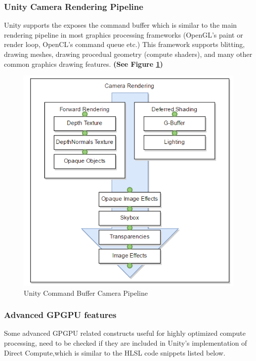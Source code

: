 \documentclass[a4paper,10pt]{article}
\begin{document}
\pagebreak


\subsubsection{Unity Camera Rendering Pipeline}
Unity supports the exposes the command buffer which is similar to the main rendering pipeline in most graphics processing frameworks (OpenGL's paint or render loop, OpenCL's command queue etc.) This framework supports blitting, drawing meshes, drawing procedual geometry (compute shaders), and many other common graphics drawing features. \textbf{(See Figure \ref{fig:gpuPipe})}

\begin{figure}[H]
	\includegraphics[width=\linewidth,height=\paperheight,keepaspectratio]{cameraRender.png}
	\caption{Unity Command Buffer Camera Pipeline}
	\label{fig:gpuPipe}
	\end{figure}

\pagebreak

\subsubsection{Advanced GPGPU features}
Some advanced GPGPU related constructs useful for highly optimized compute 
processing, need to be checked if they are included in Unity's implementation of Direct Compute,which 
is similar to the HLSL code snippets listed below.
\end{document}
